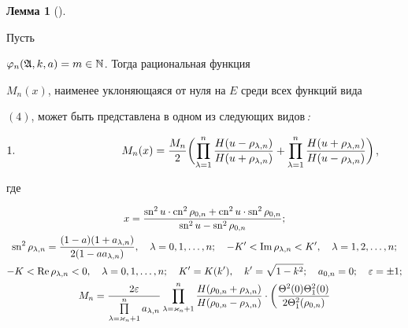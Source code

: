 \medskip





{\bf Лемма 1} (\cite{9}). {\it


Пусть


$\varphi_n(\frak A,k,a)=m\in\Bbb N$. Тогда рациональная функция


$M_n(x)$, наименее уклоняющаяся от нуля на $E$ среди всех функций вида


$(4)$, может быть представлена в одном из следующих видов\,{\em :}





$1.\hspace{3.4cm}\displaystyle


M_n(x)=\frac{M_n}{2}\biggl(\prod^n_{\lambda=1}


\frac{H(u-\rho_{\lambda,n})}{H(u+\rho_{\lambda,n})}+


\prod^n_{\lambda=1}


\frac{H(u+\rho_{\lambda,n})}{H(u-\rho_{\lambda,n})}\biggr)$,





\noindent где


\begin{gather*}


x=\frac{\sn^2u\cdot \cn^2\rho_{0,n}+\cn^2u\cdot \sn^2\rho_{0,n}}


{\sn^2u-\sn^2\rho_{0,n}};\\


\sn^2\rho_{\lambda,n}=


\frac{(1-a)(1+a_{\lambda,n})}{2(1-a a_{\lambda,n})},\quad


\lambda=0,1,\dotsc,n;\quad -K'<\im\rho_{\lambda,n}<K',\quad


\lambda=1,2,\dotsc,n;\\


-K<\re\rho_{\lambda,n}<0,\quad \lambda=0,1,\dotsc,n;\quad


K'=K(k'),\quad k'=\sqrt{1-k^2};\quad


a_{0,n}=0;\quad \varepsilon=\pm 1;\\


M_n=\frac{2\varepsilon}{\prod\limits^n_{\lambda=\varkappa_n+1}


a_{\lambda,n}}\prod^n_{\lambda=\varkappa_n+1}


\frac{H(\rho_{0,n}+\rho_{\lambda,n})}{H(\rho_{0,n}-\rho_{\lambda,n})}\cdot


\biggl(\frac{\Theta^2(0)\Theta^2_1(0)}{2\Theta^2_1(\rho_{0,n})


}
\end{gather*}}
